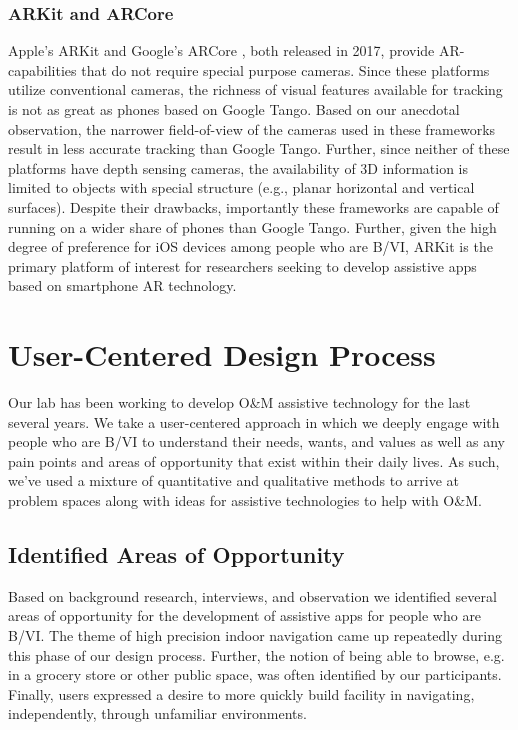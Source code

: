 \documentclass[chi_draft]{sigchi}
\newcommand{\BVI}{B/VI\xspace}
\newcommand{\OM}{O\&M\xspace}
\begin{document}
\subsubsection{ARKit and ARCore}

Apple's ARKit \cite{arkit} and Google's ARCore \cite{arcore}, both released in 2017, provide AR-capabilities that do not require special purpose cameras.  Since these platforms utilize conventional cameras, the richness of visual features available for tracking is not as great as phones based on Google Tango.  Based on our anecdotal observation, the narrower field-of-view of the cameras used in these frameworks result in less accurate tracking than Google Tango.  Further, since neither of these platforms have depth sensing cameras, the availability of 3D information is limited to objects with special structure (e.g., planar horizontal and vertical surfaces).  Despite their drawbacks, importantly these frameworks are capable of running on a wider share of phones than Google Tango.  Further, given the high degree of preference for iOS devices among people who are \BVI \cite{morris2014blind}, ARKit is the primary platform of interest for researchers seeking to develop assistive apps based on smartphone AR technology.

\section{User-Centered Design Process}
Our lab has been working to develop \OM assistive technology for the last several years.  We take a user-centered approach in which we deeply engage with people who are \BVI to understand their needs, wants, and values as well as any pain points and areas of opportunity that exist within their daily lives.  As such, we've used a mixture of quantitative and qualitative methods to arrive at problem spaces along with ideas for assistive technologies to help with \OM.

\subsection{Identified Areas of Opportunity}
Based on background research, interviews, and observation we identified several areas of opportunity for the development of assistive apps for people who are \BVI.  The theme of high precision  indoor navigation came up repeatedly during this phase of our design process.  Further, the notion of being able to browse, e.g. in a grocery store or other public space, was often identified by our participants.  Finally, users expressed a desire to more quickly build facility in navigating, independently, through unfamiliar environments.
\end{document}
